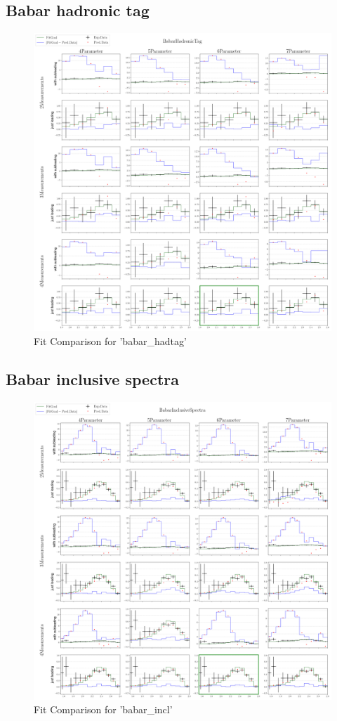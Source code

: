 \documentclass[a4paper,12pt]{article}
\begin{document}
\subsection{Babar hadronic tag}
\begin{figure}[H]
    \centering
    \includegraphics[scale=0.3]{../compare/babar_hadtag_soft_compare.png}
    \caption{Fit Comparison for 'babar\_hadtag'}
\end{figure}
\subsection{Babar inclusive spectra}
\begin{figure}[H]
    \centering
    \includegraphics[scale=0.3]{../compare/babar_incl_soft_compare.png}
    \caption{Fit Comparison for 'babar\_incl'}
\end{figure}
\end{document}
